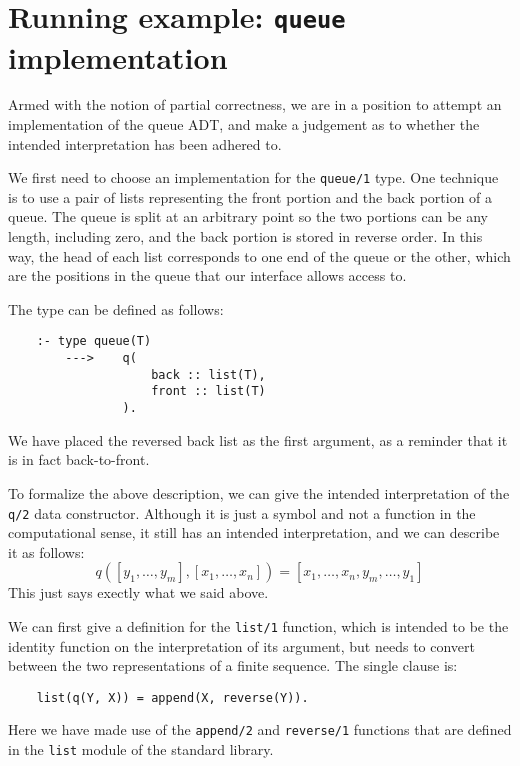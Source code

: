 \section{Running example: \texttt{queue} implementation}
\label{sec:queue-impl}

Armed with the notion of partial correctness,
we are in a position to attempt
an implementation of the queue ADT,
and make a judgement as to
whether the intended interpretation has been adhered to.

We first need to choose an implementation for the \texttt{queue/1} type.
One technique is to use a pair of lists
representing the front portion and the back portion of a queue.
The queue is split at an arbitrary point
so the two portions can be any length, including zero,
and the back portion is stored in reverse order.
In this way,
the head of each list corresponds to
one end of the queue or the other,
which are the positions in the queue
that our interface allows access to.

The type can be defined as follows:
\begin{verbatim}
    :- type queue(T)
        --->    q(
                    back :: list(T),
                    front :: list(T)
                ).
\end{verbatim}
We have placed the reversed back list as the first argument,
as a reminder that it is in fact back-to-front.

To formalize the above description,
we can give the intended interpretation of the \texttt{q/2}
data constructor.
Although it is just a symbol
and not a function in the computational sense,
it still has an intended interpretation,
and we can describe it as follows:
\[
    q([y_1, \ldots, y_m], [x_1, \ldots, x_n]) =
        [x_1, \ldots, x_n, y_m, \ldots, y_1]
\]
This just says exectly what we said above.

We can first give a definition for the \texttt{list/1} function,
which is intended to be the identity function
on the interpretation of its argument,
but needs to convert between the two representations
of a finite sequence.
The single clause is:
\begin{verbatim}
    list(q(Y, X)) = append(X, reverse(Y)).
\end{verbatim}
Here we have made use of
the \texttt{append/2} and \texttt{reverse/1} functions
that are defined in the \texttt{list} module
of the standard library.

